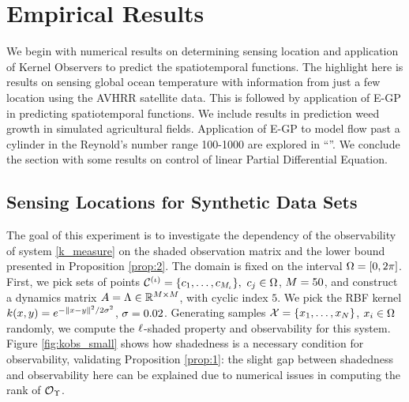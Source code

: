 \section{Empirical Results}
We begin with numerical results on determining sensing location and application of Kernel Observers to predict the spatiotemporal functions. The highlight here is results on sensing global ocean temperature with information from just a few location using the AVHRR satellite data. This is followed by application of E-GP in predicting spatiotemporal functions. We include results in prediction weed growth in simulated agricultural fields. Application of E-GP to model flow past a cylinder in the Reynold's number range 100-1000 are explored in ``''. We conclude the section with some results on control of linear Partial Differential Equation.

\subsection{Sensing Locations for Synthetic Data Sets}\label{sec:exp}
 The goal of this experiment is to investigate the dependency of the observability of system \eqref{k_measure} on the shaded observation matrix and the lower bound presented in Proposition \ref{prop:2}. The domain is fixed on the interval $\Omega = [0,2\pi]$. First, we pick sets of points $\mathcal{C}^{(\iota)} = \{c_1,\dots,c_{M_{\iota}}\}, \ c_{j}\in\Omega$, $M=50$, and construct a dynamics matrix $A = \Lambda \in {\mathbb{R}^{M\times M}}$, with cyclic index $5$.  We pick the RBF kernel $k(x,y) = e^{-\|x-y\|^2/2\sigma^2}$, $\sigma=0.02$. Generating samples $\mathcal{X}=\{x_1, \dots, x_{N}\}$, $x_{i}\in\Omega$ randomly, we compute the $\ell$-shaded property and observability for this system. Figure \ref{fig:kobs_small} shows how shadedness is a necessary condition for observability, validating Proposition \ref{prop:1}: the slight gap between shadedness and observability here can be explained due to numerical issues in computing the rank of $\mathcal{O}_{\Upsilon}$. 
 
